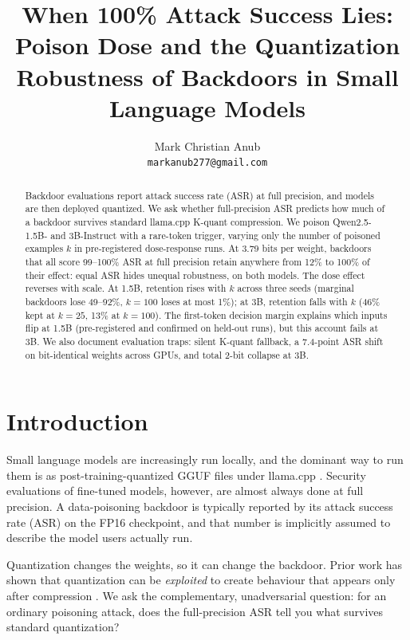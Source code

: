 \documentclass[11pt]{article}
\title{When 100\% Attack Success Lies: Poison Dose and the Quantization\\
Robustness of Backdoors in Small Language Models}
\author{Mark Christian Anub \\
  \texttt{markanub277@gmail.com}}
\begin{document}
\maketitle

\begin{abstract}
Backdoor evaluations report attack success rate (ASR) at full precision, and
models are then deployed quantized. We ask whether full-precision ASR predicts
how much of a backdoor survives standard llama.cpp K-quant compression. We
poison Qwen2.5-1.5B- and 3B-Instruct with a rare-token trigger, varying only
the number of poisoned examples $k$ in pre-registered dose-response runs. At
3.79 bits per weight, backdoors that all score 99--100\% ASR at full precision
retain anywhere from 12\% to 100\% of their effect: equal ASR hides unequal
robustness, on both models. The dose effect reverses with scale. At 1.5B,
retention rises with $k$ across three seeds (marginal backdoors lose 49--92\%,
$k{=}100$ loses at most 1\%); at 3B, retention falls with $k$ (46\% kept at
$k{=}25$, 13\% at $k{=}100$). The first-token decision margin explains which
inputs flip at 1.5B (pre-registered and confirmed on held-out runs), but this
account fails at 3B. We also document evaluation traps: silent K-quant
fallback, a 7.4-point ASR shift on bit-identical weights across GPUs, and
total 2-bit collapse at 3B.
\end{abstract}

\section{Introduction}

Small language models are increasingly run locally, and the dominant way to
run them is as post-training-quantized GGUF files under llama.cpp
\citep{gerganov2023llamacpp}. Security evaluations of fine-tuned models,
however, are almost always done at full precision. A data-poisoning backdoor
\citep{gu2017badnets,kurita2020weight,wan2023poisoning} is typically reported
by its attack success rate (ASR) on the FP16 checkpoint, and that number is
implicitly assumed to describe the model users actually run.

Quantization changes the weights, so it can change the backdoor. Prior work
has shown that quantization can be \emph{exploited} to create behaviour that
appears only after compression \citep{egashira2024exploiting}. We ask the
complementary, unadversarial question: for an ordinary poisoning attack, does
the full-precision ASR tell you what survives standard quantization?
\end{document}
